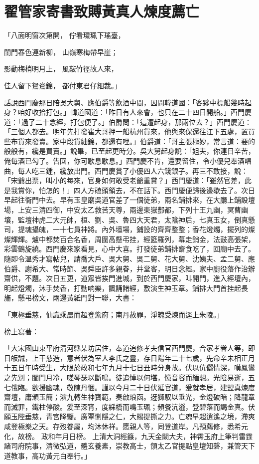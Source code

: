%

\chapter{翟管家寄書致賻\KG 黃真人煉度薦亡}


「八面明窗次第開，  佇看環珮下瑤臺，

閨門春色連新柳，  山嶺寒梅帶早崖；

影動梅梢明月上，  風敲竹徑故人來，

佳人留下鴛鴦錦，  都付東君仔細裁。」

話說西門慶那日陪吳大舅、應伯爵等飲酒中間，因問韓道國：「客夥中標船幾時起身？咱好收拾打包。」韓道國道：「昨日有人來會，也只在二十四日開船。」西門慶道：「過了二十念經，打包便了。」伯爵問：「這遭起身，那兩位去？」西門慶道：「三個人都去。明年先打發崔大哥押一船杭州貨來，他與來保還往江下五處，置買些布貨來發賣。家中段貨紬錦，都還有哩。」伯爵道：「哥主張極妙，常言道：要的般般有，纔是買賣。」說畢，已至起更時分。吳大舅起身說：「姐夫，你連日辛苦，俺每酒已勾了。告回，你可歇息歇息。」西門慶不肯，還要留住，令小優兒奉酒唱曲，每人吃三鍾，纔放出門。西門慶賞了小優四人六錢銀子。再三不敢接，說：「宋爺出票，叫小的每來，官身如何敢受老爺重賞？」西門慶道：「雖然官差，此是我賞你，怕怎的！」四人方磕頭領去，不在話下。西門慶便歸後邊歇去了。次日早起往衙門中去。早有玉皇廟吳道官差了一個徒弟，兩名鋪排來，在大廳上鋪設壇場，上安三清四御，中安太乙救苦天尊，兩邊東嶽酆都，下列十王九幽，冥曹幽壤，監壇神虎二大元帥，桓、劉、吳、魯四大天君，太陰神后，七真玉女，倒真懸司，提魂攝魄，一十七員神將。內外壇場，鋪設的齊齊整整；香花燈燭，擺列的燦燦輝輝。爐中都焚百合名香，周圍高懸弔挂，經筵羅列，幕走銷金，法鼓高張架，彩雲鶴旋繞。西門慶來家看見，心中大喜。打發徒弟鋪排齋食吃了，回廟中去了。隨即令溫秀才寫帖兒，請喬大戶、吳大舅、吳二舅、花大舅、沈姨夫、孟二舅、應伯爵、謝希大、常時節、吳舜臣許多親眷，并堂客，明日念經。家中廚役落作治辦齋供，不題。次日五更，道眾皆挨門進城，到於西門慶家，叫開門，進入經壇內，明起燈燭，沐手焚香，打動响樂，諷誦諸經，敷演生神玉章。鋪排大門首挂起長旛，懸弔榜文，兩邊黃紙門對一聯，大書：

「東極垂慈，仙識乘晨而超登紫府；南丹赦罪，淨魄受煉而逕上朱陵。」

榜上寫著：

「大宋國山東平府清河縣某坊居住，奉道追修孝夫信官西門慶，合家孝眷人等，即日皈誠，上干慈造，意者伏為室人李氏之靈，存日陽年二十七歲，先命辛未相正月十五日午時受生，大限於政和七年九月十七日丑時分身故。伏以伉儷情深，嘆鳳鸞之先別；閨門月冷，嗟琴瑟以斷鳴。徒追悼以何堪，憶音容而緬想。光陰易逝，五七俄臨。欲援幽魂，敬陳丹悃。謹以今月二十日伏延官道，爰就孝居，建盟真煉度齋壇，庸頒玉簡；演九轉生神寶範，奏啟琅函。迓獅馭以垂光，金燈破暗；降龍章而滅罪，鐵柱停酸。爰至深宵，度綵橋而鳴玉珮；頻餐沆瀣，登碧落而謁金真。伏願玉陛垂慈，青宮降鑒。廣覃惻隱之仁，大賜提撕之力。亡魂早超逍遙之境，滯爽咸登極樂之天。存歿眷屬，均沐休祥。愿親人等，同登道岸。凡預薦修，悉希元化，故榜。 政和年月日榜。 上清大洞經籙，九天金闕大夫，神霄玉府上筆判雷霆諸司府院事，清微弘道，體玄養素，崇教高士，領太乙官提點皇壇知磬，兼管天下道教事，高功黃元白奉行。」


